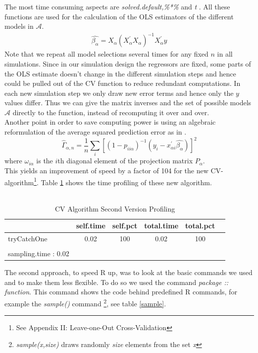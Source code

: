 \documentclass[Research_Module_ES.tex]{subfiles}
\begin{document}
The most time consuming aspects are {\itshape solved.default,\%*\%} and {\itshape t} . All these functions are used for the calculation of the OLS estimators of the different models in $\mathcal{A}$.
\begin{align*}
\hat{\beta_\alpha}=X_\alpha(X^\prime_\alpha X_\alpha)^{-1}X_\alpha^\prime y
\end{align*}
Note that we repeat all model selections several times for any fixed $n$ in all simulations. Since in our simulation design the regressors are fixed, some parts of the OLS estimate doesn't change in the different simulation steps and hence could be pulled out of the CV function to reduce redundant computations. In each new simulation step we only draw new error terms and hence only the $y$ values differ. Thus we can give the matrix inverses and the set of possible models $\mathcal{A}$ directly to the function, instead of recomputing it over and over.
\\
Another point in order to save computing power is using an algebraic reformulation of the average squared prediction error as in \cite{shao}.
\[
	\hat{\Gamma}_{\alpha,n}=\frac{1}{n}\sum_i[(1-p_{ii\alpha})^{-1}(y_i-x^\prime_{\alpha i}\hat{\beta_\alpha})]^2
\]
where $\omega_{i\alpha}$ is the $i$th diagonal element of the projection matrix $P_\alpha$.\\
This yields an improvement of speed by a factor of 104 for the new CV-algorithm\footnote{See Appendix II: Leave-one-Out Cross-Validation}. Table \ref{CVneu} shows the time profiling of these new algorithm.\\
\\
\begin{table}[!h]
	\caption{CV Algorithm Second Version Profiling }
	\label{CVneu}
	\centering
	\begin{tabular}{lccccc}
		\toprule
		\midrule
		\textbf{\scriptsize }
		&\textbf{\scriptsize self.time}
		&\textbf{\scriptsize self.pct}
		&\textbf{\scriptsize total.time}
		&\textbf{\scriptsize total.pct}
		\\\midrule\midrule
		\scriptsize tryCatchOne & \scriptsize 0.02 & \scriptsize 100 &\scriptsize 0.02 & \scriptsize 100 \\
		\\
		\scriptsize sampling.time : 0.02
	\end{tabular}
\end{table}
The second approach, to speed R up,  was to look at the basic commands we used and to make them less flexible. To do so we used the command {\itshape package :: function}. This command shows the code behind predefined R commands, for example the {\itshape sample()} command \footnote{{\itshape sample(x,size)} draws randomly {\itshape size} elements from the set {\itshape x} }, see table \ref{sample}.
\end{document}
